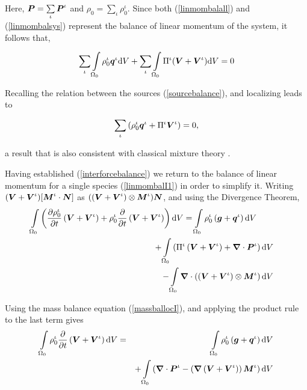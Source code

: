 \noindent Here, $\mbox{\boldmath$ P$} = \sum\limits_{\iota}\mbox{\boldmath$ P$}^\iota$ and
$\rho_0=\sum\limits_{\iota}\rho_0^\iota$. Since both
(\ref{linmombalall}) and (\ref{linmombalsys}) represent the
balance of linear momentum of the system, it follows that,

\begin{eqnarray}
\sum\limits_{\iota}\int\limits_{\Omega_0} \rho^\iota_0\mbox{\boldmath$ q$}^\iota
\mathrm{d}V + \sum\limits_{\iota}\int\limits_{\Omega_0}
\Pi^\iota(\mbox{\boldmath$ V$}+\mbox{\boldmath$ V$}^\iota) \mathrm{d}V = 0
\end{eqnarray}

Recalling the relation between the sources (\ref{sourcebalance}),
and localizing leads to

\begin{eqnarray}
\sum\limits_{\iota}\left(\rho^\iota_0\mbox{\boldmath$ q$}^\iota +
\Pi^\iota\mbox{\boldmath$ V$}^\iota\right)=0, \label{interforcebalance}
\end{eqnarray}

\noindent a result that is also consistent with classical mixture
theory \citep{TruesdellNoll:65}.

Having established (\ref{interforcebalance}) we return to the
balance of linear momentum for a single species
(\ref{linmombalI1}) in order to simplify it. Writing
$(\mbox{\boldmath$ V$}+\mbox{\boldmath$ V$}^\iota)[\mbox{\boldmath$ M$}^\iota\cdot\mbox{\boldmath$ N$}]$ as
$((\mbox{\boldmath$ V$}+\mbox{\boldmath$ V$}^\iota)\otimes\mbox{\boldmath$ M$}^\iota)\mbox{\boldmath$ N$}$, and using the Divergence
Theorem,
\begin{eqnarray}
\int\limits_{\Omega_0} \left(\frac{\partial\rho_0^\iota}{\partial
t}\left(\mbox{\boldmath$ V$}+\mbox{\boldmath$ V$}^\iota\right) +
\rho_0^\iota\frac{\partial}{\partial
t}\left(\mbox{\boldmath$ V$}+\mbox{\boldmath$ V$}^\iota\right)\right) \mathrm{d}V =
\int\limits_{\Omega_0}\rho^\iota_0\left(\mbox{\boldmath$ g$}+\mbox{\boldmath$ q$}^\iota\right)\mathrm{d}V\qquad& &\nonumber\\
+\int\limits_{\Omega_0}\left(\Pi^\iota\left(\mbox{\boldmath$ V$}+\mbox{\boldmath$ V$}^\iota\right) +
\mbox{\boldmath$\nabla$}\cdot\mbox{\boldmath$ P$}^\iota\right)
\mathrm{d}V& & \nonumber\\
-
\int\limits_{\Omega_0}\mbox{\boldmath$\nabla$}\cdot\left(\left(\mbox{\boldmath$ V$}+\mbox{\boldmath$ V$}^\iota\right)\otimes\mbox{\boldmath$ M$}^\iota\right)\mathrm{d}V
& &
\end{eqnarray}

\noindent Using the mass balance equation (\ref{massballocI}), and
applying the product rule to the last term gives
\begin{eqnarray}
\int\limits_{\Omega_0} \rho_0^\iota\frac{\partial}{\partial
t}\left(\mbox{\boldmath$ V$}+\mbox{\boldmath$ V$}^\iota\right) \mathrm{d}V &=&
\int\limits_{\Omega_0}\rho^\iota_0\left(\mbox{\boldmath$ g$}+\mbox{\boldmath$ q$}^\iota\right)\mathrm{d}V\nonumber\\
& &+
\int\limits_{\Omega_0}\left(\mbox{\boldmath$\nabla$}\cdot\mbox{\boldmath$ P$}^\iota-\left(\mbox{\boldmath$\nabla$}\left(\mbox{\boldmath$ V$}+\mbox{\boldmath$ V$}^\iota\right)\right)\mbox{\boldmath$ M$}^\iota\right)\mathrm{d}V
\end{eqnarray}

